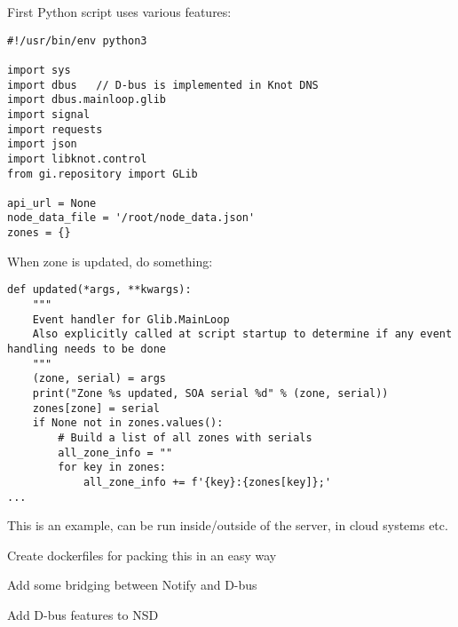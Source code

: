 \documentclass[Screen16to9,17pt]{foils}
\begin{document}

First Python script uses various features:
\begin{verbatim}
#!/usr/bin/env python3

import sys
import dbus   // D-bus is implemented in Knot DNS
import dbus.mainloop.glib
import signal
import requests
import json
import libknot.control
from gi.repository import GLib

api_url = None
node_data_file = '/root/node_data.json'
zones = {}
\end{verbatim}



When zone is updated, do something:
\begin{verbatim}
def updated(*args, **kwargs):
    """
    Event handler for Glib.MainLoop
    Also explicitly called at script startup to determine if any event handling needs to be done
    """
    (zone, serial) = args
    print("Zone %s updated, SOA serial %d" % (zone, serial))
    zones[zone] = serial
    if None not in zones.values():
        # Build a list of all zones with serials
        all_zone_info = ""
        for key in zones:
            all_zone_info += f'{key}:{zones[key]};'
...
\end{verbatim}

This is an example, can be run inside/outside of the server, in cloud systems etc.





\begin{list2}
\item Create dockerfiles for packing this in an easy way
\item Add some bridging between Notify and D-bus
\item Add D-bus features to NSD
\end{list2}
\end{document}
